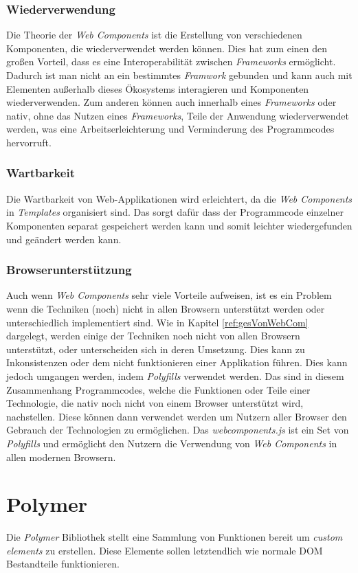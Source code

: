 \documentclass[12pt, paper=a4, bibtotoc, toc=listof, headsepline=true]{scrreprt}
\begin{document}
			\subsection{Wiederverwendung}
			Die Theorie der \emph{Web Components} ist die Erstellung von verschiedenen Komponenten, die wiederverwendet werden können. Dies hat zum einen den großen Vorteil, dass es eine Interoperabilität zwischen \emph{Frameworks} ermöglicht.\cite[S.2]{patel2015learning} Dadurch ist man nicht an ein bestimmtes \emph{Framwork} gebunden und kann auch mit Elementen außerhalb dieses Ökosystems interagieren und Komponenten wiederverwenden. Zum anderen können auch innerhalb eines \emph{Frameworks} oder nativ, ohne das Nutzen eines \emph{Frameworks}, Teile der Anwendung wiederverwendet werden, was eine Arbeitserleichterung und Verminderung des Programmcodes hervorruft. 
			\subsection{Wartbarkeit}
			Die Wartbarkeit von Web-Applikationen wird erleichtert, da die \emph{Web Components} in \emph{Templates} organisiert sind.\cite[vgl. S.2]{patel2015learning} Das sorgt dafür dass der Programmcode einzelner Komponenten separat gespeichert werden kann und somit leichter wiedergefunden und geändert werden kann.
			\subsection{Browserunterstützung}
			Auch wenn \emph{Web Components} sehr viele Vorteile aufweisen, ist es ein Problem wenn die Techniken (noch) nicht in allen Browsern unterstützt werden oder unterschiedlich implementiert sind. Wie in Kapitel \ref{ref:gesVonWebCom} dargelegt, werden einige der Techniken noch nicht von allen Browsern unterstützt, oder unterscheiden sich in deren Umsetzung. Dies kann zu Inkonsistenzen oder dem nicht funktionieren einer Applikation führen. Dies kann jedoch umgangen werden, indem \emph{Polyfills} verwendet werden. Das sind in diesem Zusammenhang Programmcodes, welche die Funktionen oder Teile einer Technologie, die nativ noch nicht von einem Browser unterstützt wird, nachstellen. Diese können dann verwendet werden um Nutzern aller Browser den Gebrauch der Technologien zu ermöglichen.\cite[vgl. S.4]{satrom2014building} Das \emph{webcomponents.js} ist ein Set von \emph{Polyfills} und ermöglicht den Nutzern die Verwendung von \emph{Web Components} in allen modernen Browsern.\cite[vgl.]{webComJs}
\chapter{Polymer}
Die \emph{Polymer} Bibliothek stellt eine Sammlung von Funktionen bereit um \emph{custom elements} zu erstellen. Diese Elemente sollen letztendlich wie normale \ac{DOM} Bestandteile funktionieren.\cite[vgl.]{polymerFeaOve}
\end{document}
